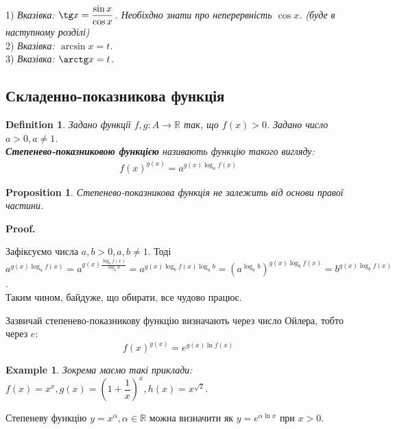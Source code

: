 \documentclass[a4paper, 14pt]{article}
\makeatletter
\def\qed{$\blacksquare$}
\theoremstyle{theoremdd}
\theoremstyle{theoremdd}
\newtheorem{definition}[theorem]{Definition}
\theoremstyle{theoremdd}
\theoremstyle{theoremdd}
\newtheorem{example}[theorem]{Example}
\theoremstyle{theoremdd}
\newtheorem{proposition}[theorem]{Proposition}
\theoremstyle{theoremdd}
\theoremstyle{theoremdd}
\theoremstyle{theoremdd}
\renewenvironment{proof}[1][Proof.\\]{\par
\pushQED{\hfill \qed}%
\normalfont \topsep6\p@\@plus6\p@\relax
\trivlist
\item\relax
{\bfseries
#1\@addpunct{.}}\hspace\labelsep\ignorespaces
}{%
\popQED\endtrivlist\@endpefalse
}
\makeatother
\begin{document}
1) \textit{Вказівка: $\tg x = \dfrac{\sin x}{\cos x}$. Необіхдно знати про неперервність $\cos x$. (буде в наступному розділі)} \\
2) \textit{Вказівка: $\arcsin x = t$.} \\
3) \textit{Вказівка: $\arctg x = t$.}

\subsection{Складенно-показникова функція}
	\begin{definition}
	Задано функції $f,g \colon A \to \mathbb{R}$ так, що $f(x)>0$. Задано число $a>0, a \neq 1$.\\
	\textbf{Степенево-показниковою функцією} називають функцію такого вигляду:
	\begin{align*}
	f(x)^{g(x)} = a^{g(x) \log_a f(x)}
	\end{align*}
	\end{definition}
	
	\begin{proposition}
	Степенево-показникова функція не залежить від основи правої частини.
	\end{proposition}
	
	\begin{proof}
	Зафіксуємо числа $a,b > 0, a,b \neq 1$. Тоді\\
	$a^{g(x) \log_a f(x)} = a^{g(x) \frac{\log_b f(x)}{\log_b a}} = a^{g(x) \log_b f(x) \log_a b} = \left( a^{\log_a b} \right)^{g(x) \log_b f(x)} = b^{g(x) \log_b f(x)}$.\\
	Таким чином, байдуже, що обирати, все чудово працює.
	\end{proof}
	
	Зазвичай степенево-показникову функцію визначають через число Ойлера, тобто через $e$:
	$$ f(x)^{g(x)} = e^{g(x) \ln f(x)} $$
	
	\begin{example}
	Зокрема маємо такі приклади: $f(x) = x^x, g(x) = \left(1 + \dfrac{1}{x} \right)^x, h(x) = x^{\sqrt{2}}$.
	\end{example}
	
	Степеневу функцію $y = x^{\alpha}, \alpha \in \mathbb{R}$ можна визначити як $y = e^{\alpha \ln x}$ при $x > 0$.
\end{document}
